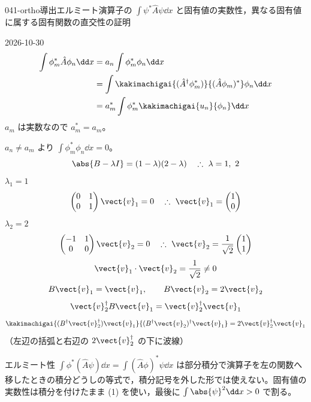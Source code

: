 \documentclass[uplatex,dvipdfmx,a4paper,11pt]{jsarticle}
\begin{document}
\begin{mondai}{041-ortho}{導出}{エルミート演算子の $\int\psi^{*}\hat{A}\psi\dd x$ と固有値の実数性，異なる固有値に属する固有関数の直交性の証明}
\begin{kotaeutsushi}{2026-10-30}
\begin{align*}
\int\phi_{m}^{*}\hat{A}\phi_{n}\dd x&=a_{n}\int\phi_{m}^{*}\phi_{n}\dd x\\
&=\int\kakimachigai{(\hat{A}^{\dagger}\phi_{m}^{*})}{(\hat{A}\phi_{m})^{*}}\phi_{n}\dd x\\
&=a_{m}^{*}\int\phi_{m}^{*}\kakimachigai{u_{n}}{\phi_{n}}\dd x
\end{align*}
$a_{m}$ は実数なので $a_{m}^{*}=a_{m}$。

$a_{n}\neq a_{m}$ より $\int\phi_{m}^{*}\phi_{n}\dd x=0$。
\[ \abs{B-\lambda I}=(1-\lambda)(2-\lambda)\quad\therefore\ \lambda=1,\ 2 \]
$\lambda_{1}=1$
\[ \begin{pmatrix}0&1\\0&1\end{pmatrix}\vect{v}_{1}=0\quad\therefore\ \vect{v}_{1}=\begin{pmatrix}1\\0\end{pmatrix} \]
$\lambda_{2}=2$
\[ \begin{pmatrix}-1&1\\0&0\end{pmatrix}\vect{v}_{2}=0\quad\therefore\ \vect{v}_{2}=\frac{1}{\sqrt{2}}\begin{pmatrix}1\\1\end{pmatrix} \]
\[ \vect{v}_{1}\cdot\vect{v}_{2}=\frac{1}{\sqrt{2}}\neq0 \]
\[ B\vect{v}_{1}=\vect{v}_{1},\qquad B\vect{v}_{2}=2\vect{v}_{2} \]
\[ \vect{v}_{2}^{\dagger}B\vect{v}_{1}=\vect{v}_{2}^{\dagger}\vect{v}_{1} \]
\[ \kakimachigai{(B^{\dagger}\vect{v}_{2}^{\dagger})\vect{v}_{1}}{(B^{\dagger}\vect{v}_{2})^{\dagger}\vect{v}_{1}}=2\vect{v}_{2}^{\dagger}\vect{v}_{1} \]
（左辺の括弧と右辺の $2\vect{v}_{2}^{\dagger}$ の下に波線）
\end{kotaeutsushi}
\begin{kizuki}
\item エルミート性 $\int\phi^{*}(\hat{A}\psi)\dd x=\int(\hat{A}\phi)^{*}\psi\dd x$ は部分積分で演算子を左の関数へ移したときの積分どうしの等式で，積分記号を外した形では使えない。固有値の実数性は積分を付けたまま (1) を使い，最後に $\int\abs{\psi}^{2}\dd x>0$ で割る。

\end{kizuki}
\end{mondai}
\end{document}
